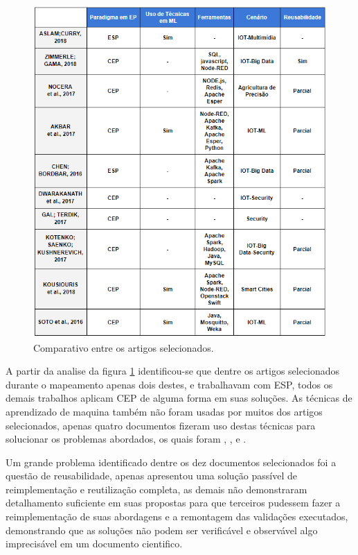 \documentclass[ti,table]{texufpel} %
\begin{document}
\begin{figure}
	\centering
	\includegraphics[width=1\textwidth]{imagens/comparacaoArtigos.png}
	\caption{Comparativo entre os artigos selecionados.}
	\label{fig:comparacaoArtigos}
\end{figure}


A partir da analise da figura \ref{fig:comparacaoArtigos} identificou-se que dentre os artigos selecionados durante o mapeamento apenas dois destes, \cite{art1aslam2018towards} e \cite{art5chen2016dress} trabalhavam com ESP, todos os demais trabalhos aplicam CEP de alguma forma em suas soluções. As técnicas de aprendizado de maquina também não foram usadas por muitos dos artigos selecionados, apenas quatro documentos fizeram uso destas técnicas para solucionar os problemas abordados, os quais foram \cite{art1aslam2018towards}, \cite{art4akbar2017predictive}, \cite{art9kousiouris2018integrated} e \cite{art10soto2016ceml}. 

Um grande problema identificado dentre os dez documentos selecionados foi a questão de reusabilidade, apenas \cite{art2zimmerle2018web} apresentou uma solução passível de reimplementação e reutilização completa, as demais não demonstraram detalhamento suficiente em suas propostas para que terceiros pudessem  fazer a reimplementação de suas abordagens e a remontagem das validações executados, demonstrando que as soluções não podem ser verificável e observável algo imprecisável em um documento cientifico. 
\end{document}
